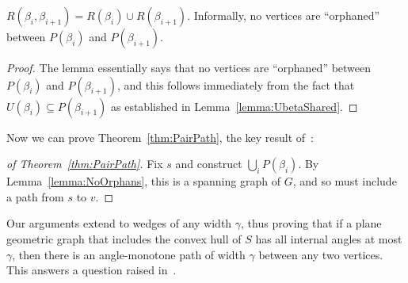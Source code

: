 \documentclass{cccg17}
\newcommand{\cyannew}[1]{{#1}}  %
\newcommand{\rednote}[1]{{}}  %
\newcommand{\lemlab}[1]{\label{lemma:#1}}
\newcommand{\lemref}[1]{\ref{lemma:#1}}
\newcommand{\thmref}[1]{\ref{thm:#1}}
\def\b{{\beta}}
\begin{document}
\begin{lemma}
$R(\b_i, \b_{i+1}) = R(\b_i) \cup R(\b_{i+1})$.
Informally, no vertices are ``orphaned'' between $P(\b_i)$ and $P(\b_{i+1})$.
\lemlab{NoOrphans}
\end{lemma}
\begin{proof}
\rednote{AL: We could avoid the fuss by taking the "Informally . . " sentence out of the Lemma statement and giving as proof:}
\cyannew{The lemma essentially says that no vertices are ``orphaned'' between $P(\b_i)$ and $P(\b_{i+1})$, and this follows immediately from the fact that $U(\b_i) \subseteq P(\b_{i+1})$ as established in Lemma~\lemref{UbetaShared}.}
%
\end{proof}

\noindent
Now we can prove Theorem~\thmref{PairPath}, the key result of~\cite{dfg-icgps-15}:
\begin{proof}[of Theorem~\thmref{PairPath}]
Fix $s$ and construct $\bigcup_i P(\b_i)$.
By Lemma~\lemref{NoOrphans}, this is a spanning graph of $G$, and so must
include a path from $s$ to $v$.
\end{proof}

Our arguments extend to wedges of any width $\gamma$, thus proving that 
if a plane geometric graph that includes the convex hull of $S$ has all internal angles at most $\gamma$, then there is an angle-monotone path of width $\gamma$ between any two vertices.
This answers a question raised in~\cite{bbcklv-gtamg-16}.

\rednote{Rev1:
``Section 3 suffers from the fact that you forgot to define angle-monotone spanning trees. I take that you mean the following: For a fixed node s, the required spanning tree T(s) contains an angle-monotone path between s and every other node. But the name leaves room for several variations (is the angle of monotonicity required to be the same for all the paths in the tree? Are the paths required to exist between any pair of nodes and not only from a source s to all the other nodes?), so please introduce a definition."}
\end{document}
